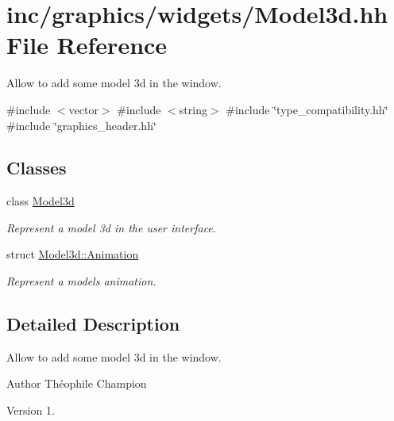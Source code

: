 \hypertarget{Model3d_8hh}{}\section{inc/graphics/widgets/\+Model3d.hh File Reference}
\label{Model3d_8hh}


Allow to add some model 3d in the window.  


{\ttfamily \#include $<$vector$>$}\newline
{\ttfamily \#include $<$string$>$}\newline
{\ttfamily \#include \char`\"{}type\+\_\+compatibility.\+hh\char`\"{}}\newline
{\ttfamily \#include \char`\"{}graphics\+\_\+header.\+hh\char`\"{}}\newline
\subsection*{Classes}
\begin{DoxyCompactItemize}
\item 
class \hyperlink{classModel3d}{Model3d}
\begin{DoxyCompactList}\small\item\em Represent a model 3d in the user interface. \end{DoxyCompactList}\item 
struct \hyperlink{structModel3d_1_1Animation}{Model3d\+::\+Animation}
\begin{DoxyCompactList}\small\item\em Represent a model\textquotesingle{}s animation. \end{DoxyCompactList}\end{DoxyCompactItemize}


\subsection{Detailed Description}
Allow to add some model 3d in the window. 

\begin{DoxyAuthor}{Author}
Théophile Champion 
\end{DoxyAuthor}
\begin{DoxyVersion}{Version}
1. 
\end{DoxyVersion}
